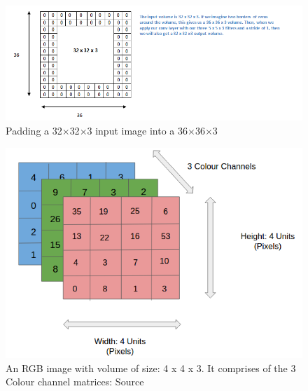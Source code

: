 \documentclass[master]{thesis-uestc}
\begin{document}
\begin{figure}[ht]
\includegraphics[width=7in]{pic/padding.png}
\caption{Padding a 32$\times$32$\times$3 input image into a 36$\times$36$\times$3}
\label{fig_padding}
\end{figure}

\begin{figure}[ht]
\includegraphics[width=5in]{pic/rgb_image.png}
\caption{An RGB image with volume of size: 4 x 4 x 3. It comprises of the 3 Colour channel matrices: Source }
\label{rgb_image}
\end{figure}
\end{document}
